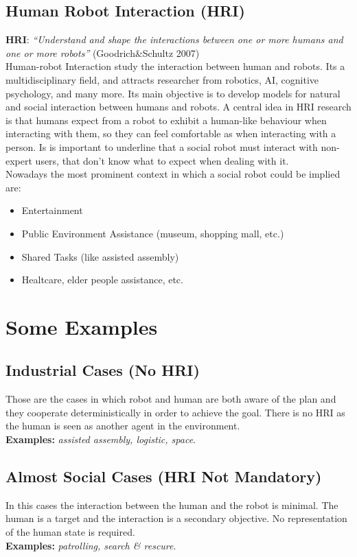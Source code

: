 \documentclass[pdftex,12pt,a4paper]{report}
\begin{document}
\subsection{Human Robot Interaction (HRI)}
\textbf{HRI}: \textit{“Understand and shape the interactions between
one or more humans and one or more robots”} (Goodrich\&Schultz 2007)\\
\newline
Human-robot Interaction study the interaction between human and robots. Its a multidisciplinary field, and attracts researcher from robotics, AI, cognitive psychology, and many more.
Its main objective is to develop models for natural and social interaction between humans and robots. 
A central idea in HRI research is that humans expect from a robot to exhibit a human-like behaviour when interacting with them, so they can feel comfortable as when interacting with a person. Is is important to underline that a social robot must interact with non-expert users, that don't know what to expect when dealing with it.\\

\noindent Nowadays the most prominent context in which a social robot could be implied are:
\begin{itemize}
\item Entertainment 
\item Public Environment Assistance (museum, shopping mall, etc.)
\item Shared Tasks (like assisted assembly)
\item Healtcare, elder people assistance, etc.
\end{itemize}

\section{Some Examples}
\subsection{Industrial Cases (No HRI)}
Those are the cases in which robot and human are both aware of the plan and they cooperate deterministically in order to achieve the goal. There is no HRI as the human is seen as another agent in the environment.\\
\textbf{Examples:} \textit{assisted assembly, logistic, space}.

\subsection{Almost Social Cases (HRI Not Mandatory)}
In this cases the interaction between the human and the robot is minimal. The human is a target and the interaction is a secondary objective. No representation of the human state is required.\\
\textbf{Examples:} \textit{patrolling, search \& rescure}.
\end{document}
